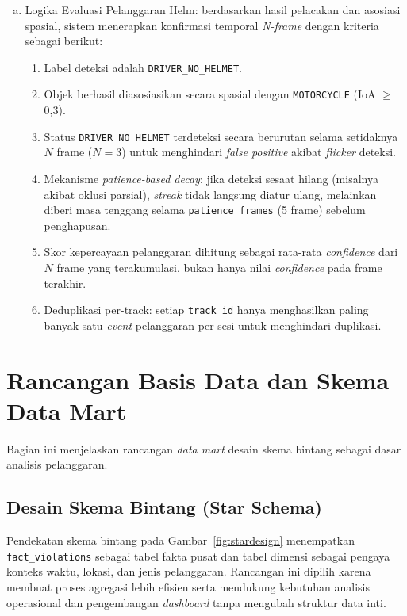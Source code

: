 \begin{enumerate}[a.]
  \item {Logika Evaluasi Pelanggaran Helm}: berdasarkan hasil pelacakan dan asosiasi spasial, sistem menerapkan konfirmasi temporal \textit{N-frame} dengan kriteria sebagai berikut:
  \begin{enumerate}[1).]
    \item Label deteksi adalah \texttt{DRIVER\_NO\_HELMET}.
    \item Objek berhasil diasosiasikan secara spasial dengan \texttt{MOTORCYCLE} (IoA $\geq$ 0{,}3).
    \item Status \texttt{DRIVER\_NO\_HELMET} terdeteksi secara berurutan selama setidaknya $N$ frame ($N=3$) untuk menghindari \textit{false positive} akibat \textit{flicker} deteksi.
    \item Mekanisme \textit{patience-based decay}: jika deteksi sesaat hilang (misalnya akibat oklusi parsial), \textit{streak} tidak langsung diatur ulang, melainkan diberi masa tenggang selama \texttt{patience\_frames} (5 frame) sebelum penghapusan.
    \item Skor kepercayaan pelanggaran dihitung sebagai rata-rata \textit{confidence} dari $N$ frame yang terakumulasi, bukan hanya nilai \textit{confidence} pada frame terakhir.
    \item Deduplikasi per-track: setiap \texttt{track\_id} hanya menghasilkan paling banyak satu \textit{event} pelanggaran per sesi untuk menghindari duplikasi.
  \end{enumerate}
\end{enumerate}

\section{Rancangan Basis Data dan Skema Data Mart}
Bagian ini menjelaskan rancangan \textit{data mart} desain skema bintang sebagai dasar analisis pelanggaran.


\subsection{Desain Skema Bintang (Star Schema)}
Pendekatan skema bintang pada Gambar~\ref{fig:stardesign} menempatkan \texttt{fact\_violations} sebagai tabel fakta pusat dan tabel dimensi sebagai pengaya konteks waktu, lokasi, dan jenis pelanggaran. Rancangan ini dipilih karena membuat proses agregasi lebih efisien serta mendukung kebutuhan analisis operasional dan pengembangan \textit{dashboard} tanpa mengubah struktur data inti.

